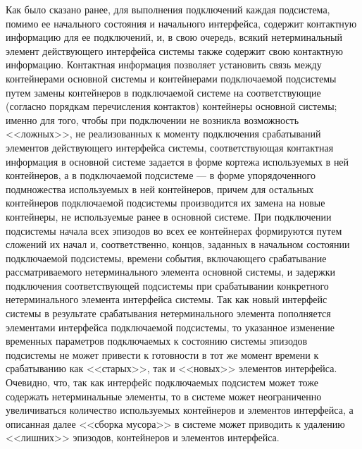 Как было сказано ранее, для выполнения подключений каждая подсистема, помимо ее начального состояния и начального интерфейса, содержит контактную информацию для ее подключений, и, в свою очередь, всякий нетерминальный элемент действующего интерфейса системы также содержит свою контактную информацию. 
Контактная информация позволяет установить связь между контейнерами основной системы и контейнерами подключаемой подсистемы путем замены контейнеров в подключаемой системе на соответствующие (согласно порядкам перечисления контактов) контейнеры основной системы; 
именно для того, чтобы при подключении не возникла возможность <<ложных>>, не реализованных к моменту подключения срабатываний элементов действующего интерфейса системы, соответствующая контактная информация в основной системе задается в форме кортежа используемых в ней контейнеров, а в подключаемой подсистеме --- в форме упорядоченного подмножества используемых в ней контейнеров, причем для остальных контейнеров подключаемой подсистемы производится их замена на новые контейнеры, не используемые ранее в основной системе. 
При подключении подсистемы начала всех эпизодов во всех ее контейнерах формируются путем сложений их начал и, соответственно, концов, заданных в начальном состоянии подключаемой подсистемы, времени события, включающего срабатывание рассматриваемого нетерминального элемента основной системы, и задержки подключения соответствующей подсистемы при срабатывании конкретного нетерминального элемента интерфейса системы. 
Так как новый интерфейс системы в результате срабатывания нетерминального элемента пополняется элементами интерфейса подключаемой подсистемы, то указанное изменение временных параметров подключаемых к состоянию системы эпизодов подсистемы не может привести к готовности в тот же момент времени к срабатыванию как <<старых>>, так и <<новых>> элементов интерфейса. 
Очевидно, что, так как интерфейс подключаемых подсистем может тоже содержать нетерминальные элементы, то в системе может неограниченно увеличиваться количество используемых контейнеров и элементов интерфейса, а описанная далее <<сборка мусора>> в системе может приводить к удалению <<лишних>> эпизодов, контейнеров и элементов интерфейса.

